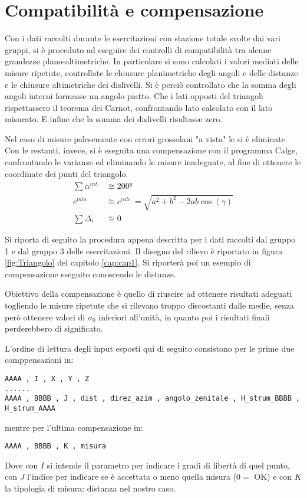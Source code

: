 \chapter{Compatibilità e compensazione}\label{cap:cap4}
Con i dati raccolti durante le esercitazioni con stazione totale svolte dai vari gruppi, si è proceduto ad eseguire dei controlli di compatibilità tra alcune grandezze plano-altimetriche.
In particolare si sono calcolati i valori mediati delle misure ripetute, controllate le chiusure planimetriche degli angoli e delle distanze e le chiusure altimetriche dei dislivelli.
Si è perciò controllato che la somma degli angoli interni formasse un angolo piatto. 
Che i lati opposti del triangoli rispettassero il teorema dei Carnot, confrontando lato calcolato con il lato misurato. 
E infine che la somma dei dislivelli risultasse zero.

Nel caso di misure palesemente con errori grossolani "a vista" le si è eliminate.
Con le restanti, invece, si è eseguita una compensazione con il programma Calge, confrontando le varianze ed eliminando le misure inadeguate, al fine di ottenere le coordinate dei punti del triangolo. 
\begin{align}
	\sum \alpha^{int.} &\cong \si{200}{^g} \label{eq:somma200}\\
	c^{mis.} &\cong c^{calc.} = \sqrt{a^2 + b^2 - 2ab\cos(\gamma)} \label{eq:carnot}\\
	\sum \Delta_i &\cong 0 \label{eq:somma0}
\end{align}

Si riporta di seguito la procedura appena descritta per i dati raccolti dal gruppo 1 e dal gruppo 3 delle esercitazioni. Il disegno del rilievo è riportato in figura \ref{fig:Triangolo} del capitolo \ref{cap:cap1}. Si riporterà poi un esempio di compensazione eseguito conoscendo le distanze.

Obiettivo della compensazione è quello di riuscire ad ottenere risultati adeguati togliendo le misure ripetute che si rilevano troppo discostanti dalle medie, senza però ottenere valori di $\sigma_0$ inferiori all'unità, in quanto poi i risultati finali perderebbero di significato. 

L'ordine di lettura degli input esposti qui di seguito consistono per le prime due comppensazioni in:
\begin{lstlisting}
AAAA , I , X , Y , Z  
......
AAAA , BBBB , J , dist , direz_azim , angolo_zenitale , H_strum_BBBB , H_strum_AAAA
\end{lstlisting}
mentre per l'ultima compensazione in:
\begin{lstlisting}
AAAA , BBBB , K , misura
\end{lstlisting}
Dove con $I$ si intende il parametro per indicare i gradi di libertà di quel punto, con $J$ l'indice per indicare se è accettata o meno quella misura ($0 = $ OK) e con $K$ la tipologia di misura: distanza nel nostro caso.
